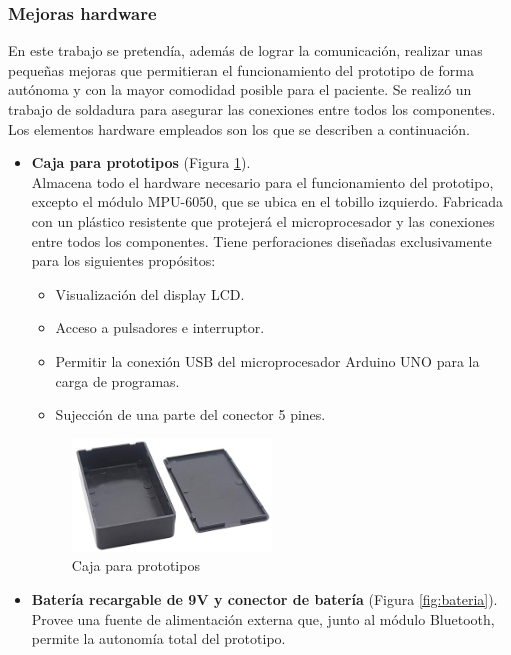 \subsubsection{Mejoras hardware}
En este trabajo se pretendía, además de lograr la comunicación, realizar unas pequeñas mejoras que permitieran el funcionamiento del prototipo de forma autónoma y con la mayor comodidad posible para el paciente. Se realizó un trabajo de soldadura para asegurar las conexiones entre todos los componentes. Los elementos hardware empleados son los que se describen a continuación.
\begin{itemize}
    \item \textbf{Caja para prototipos} (Figura \ref{fig:cajaPrototipos}). \\
    Almacena todo el hardware necesario para el funcionamiento del prototipo, excepto el módulo MPU-6050, que se ubica en el tobillo izquierdo. Fabricada con un plástico resistente que protejerá el microprocesador y las conexiones entre todos los componentes. Tiene perforaciones diseñadas exclusivamente para los siguientes propósitos:
    \begin{itemize}
        \item Visualización del display LCD.
        \item Acceso a pulsadores e interruptor.
        \item Permitir la conexión USB del microprocesador Arduino UNO para la carga de programas.
        \item Sujección de una parte del conector 5 pines.
    \end{itemize}

    \begin{figure}[h]
        \centering
        \includegraphics[width=0.5\textwidth]{img/4.TecnicasHerramientas/CajaPrototipos.png}
        \caption{Caja para prototipos \cite{CajaProt627:online}}
        \label{fig:cajaPrototipos}
    \end{figure}
    
    \item \textbf{Batería recargable de 9V y conector de batería} (Figura \ref{fig:bateria}).\\
    Provee una fuente de alimentación externa que, junto al módulo Bluetooth, permite la autonomía total del prototipo.


\end{itemize}

